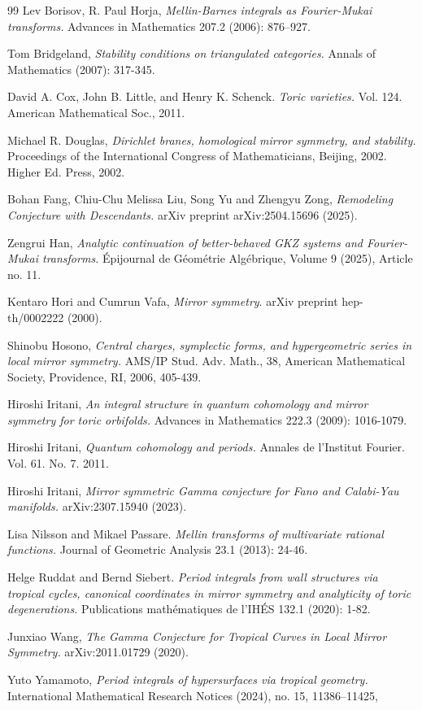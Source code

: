 \documentclass[11pt,reqno]{amsart}
\theoremstyle{definition}
\numberwithin{equation}{section}
\begin{document}
\begin{thebibliography}{99}
 Lev Borisov, R. Paul Horja, \emph{Mellin-Barnes integrals as Fourier-Mukai transforms.} Advances in Mathematics 207.2 (2006): 876--927.
 
 Tom Bridgeland, \emph{Stability conditions on triangulated categories.} Annals of Mathematics (2007): 317-345.
 
 
 David A. Cox, John B. Little, and Henry K. Schenck. \emph{Toric varieties.} Vol. 124. American Mathematical Soc., 2011.
 
 Michael R. Douglas, \emph{Dirichlet branes, homological mirror symmetry, and stability.} Proceedings of the International Congress of Mathematicians, Beijing, 2002. Higher Ed. Press, 2002.
 
 Bohan Fang, Chiu-Chu Melissa Liu, Song Yu and Zhengyu Zong, \emph{Remodeling Conjecture with Descendants.} arXiv preprint arXiv:2504.15696 (2025).
 

 
 Zengrui Han, \emph{Analytic continuation of better-behaved GKZ systems and Fourier-Mukai transforms.} \'{E}pijournal de G\'{e}om\'{e}trie Alg\'{e}brique, Volume 9 (2025), Article no. 11.
 

 
 Kentaro Hori and Cumrun Vafa, \emph{Mirror symmetry}. arXiv preprint hep-th/0002222 (2000).
 

 Shinobu Hosono, \emph{Central charges, symplectic forms, and hypergeometric series in local mirror symmetry.} AMS/IP Stud. Adv. Math., 38, American Mathematical Society, Providence, RI, 2006, 405-439.
 
Hiroshi Iritani, \emph{An integral structure in quantum cohomology and mirror symmetry for toric orbifolds.} Advances in Mathematics 222.3 (2009): 1016-1079.

Hiroshi Iritani, \emph{Quantum cohomology and periods.} Annales de l'Institut Fourier. Vol. 61. No. 7. 2011.

Hiroshi Iritani, \emph{Mirror symmetric Gamma conjecture for Fano and Calabi-Yau manifolds.} arXiv:2307.15940 (2023).

 Lisa Nilsson and Mikael Passare. \emph{Mellin transforms of multivariate rational functions.} Journal of Geometric Analysis 23.1 (2013): 24-46.
 
 Helge Ruddat and Bernd Siebert. \emph{Period integrals from wall structures via tropical cycles, canonical coordinates in mirror symmetry and analyticity of toric degenerations.} Publications math\'{e}matiques de l'IH\'{E}S 132.1 (2020): 1-82.
 
 Junxiao Wang, \emph{The Gamma Conjecture for Tropical Curves in Local Mirror Symmetry.} arXiv:2011.01729 (2020).

Yuto Yamamoto, \emph{Period integrals of hypersurfaces via tropical geometry.} International Mathematical Research Notices (2024), no. 15, 11386--11425,


\end{thebibliography}
\end{document}
